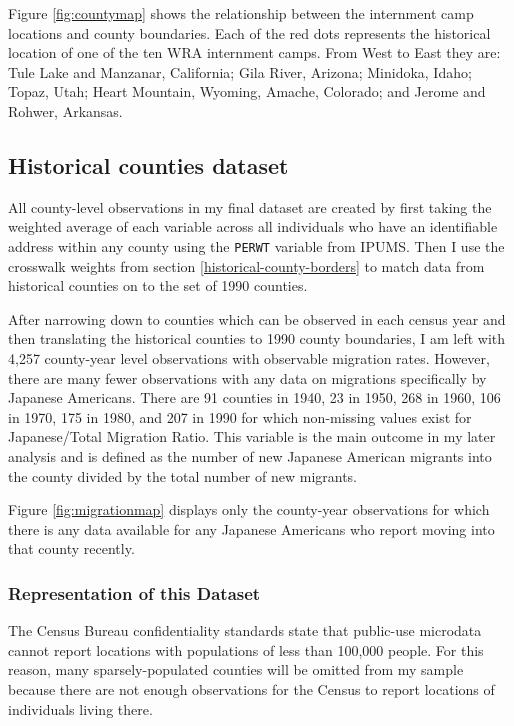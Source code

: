 \documentclass[12pt]{article}
\begin{document}
Figure \ref{fig:countymap} shows the relationship between the internment camp locations and county boundaries. 
Each of the red dots represents the historical location of one of the ten WRA internment camps. 
From West to East they are:
Tule Lake and Manzanar, California;
Gila River, Arizona;
Minidoka, Idaho;
Topaz, Utah;
Heart Mountain, Wyoming,
Amache, Colorado;
and
Jerome and Rohwer, Arkansas.

\subsection{Historical counties
dataset}\label{historical-counties-dataset}

All county-level observations in my final dataset are created by first taking the weighted average of each variable across all individuals who have an identifiable address within any county 
using the \texttt{PERWT} variable from IPUMS. 
Then I use the crosswalk weights from section \ref{historical-county-borders} to match data from historical counties on to the set of 1990 counties. 

After narrowing down to counties which can be observed in each census
year and then translating the historical counties to 1990 county
boundaries, I am left with 4,257 county-year level observations with observable migration rates.
However, there are many fewer observations with any data on migrations specifically by Japanese Americans.
There are 91 counties in 1940, 23 in 1950, 268 in 1960, 106 in 1970, 175 in 1980, and 207 in 1990 for which non-missing values exist for Japanese/Total Migration Ratio.
This variable is the main outcome in my later analysis and is defined as the number of new Japanese American migrants into the county divided by the total number of new migrants.

Figure \ref{fig:migrationmap} displays only the county-year observations for which there is any data available for any Japanese Americans who report moving into that county recently. 

\subsubsection{Representation of this Dataset}

The Census Bureau confidentiality standards state that public-use
microdata cannot report locations with populations of less
than 100,000 people. For this reason, many sparsely-populated counties
will be omitted from my sample because there are not enough observations
for the Census to report locations of individuals living there.
\end{document}

